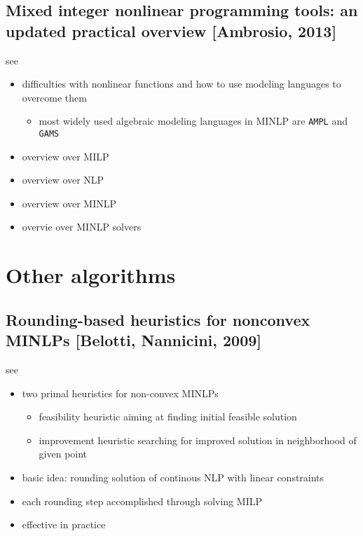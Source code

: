\documentclass{article}
\begin{document}
\subsection{Mixed integer nonlinear programming tools: an updated practical overview [Ambrosio, 2013]}
see \cite{d2013mixed}
\begin{itemize}
\item difficulties with nonlinear functions and how to use modeling languages to overcome them
	\begin{itemize}
	\item most widely used algebraic modeling languages in MINLP are \texttt{AMPL} and \texttt{GAMS}
	\end{itemize}
\item overview over MILP
\item overview over NLP
\item overview over MINLP
\item overvie over MINLP solvers
\end{itemize}

\section{Other algorithms}
\subsection{Rounding-based heuristics for nonconvex MINLPs [Belotti, Nannicini, 2009]}
see \cite{nannicini2009rounding}
\begin{itemize}
\item two primal heuristics for non-convex MINLPs
	\begin{itemize}
	\item feasibility heuristic aiming at finding initial feasible solution
	\item improvement heuristic searching for improved solution in neighborhood of given point
	\end{itemize}
\item basic idea: rounding solution of continous NLP with linear constraints
\item each rounding step accomplished through solving MILP
\item effective in practice
\end{itemize}

{}

\end{document}
